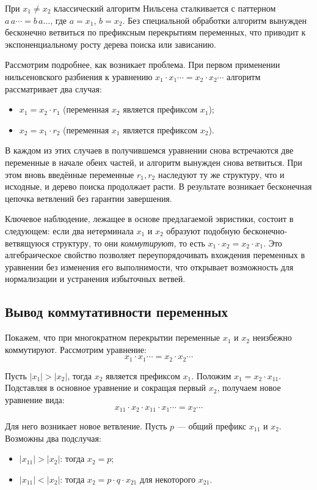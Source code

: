 \documentclass[14pt, russian]{scrartcl}
\begin{document}
При $x_1 \neq x_2$ классический алгоритм Нильсена сталкивается с паттерном
$a\,a\cdots = b\,a\ldots$, где $a = x_1$, $b = x_2$. Без специальной обработки
алгоритм вынужден бесконечно ветвиться по префиксным перекрытиям переменных,
что приводит к экспоненциальному росту дерева поиска или зависанию.

Рассмотрим подробнее, как возникает проблема. При первом применении
нильсеновского разбиения к уравнению $x_1 \cdot x_1 \cdots = x_2 \cdot x_2 \cdots$
алгоритм рассматривает два случая:
\begin{itemize}
\item $x_1 = x_2 \cdot r_1$ (переменная $x_2$ является префиксом $x_1$);
\item $x_2 = x_1 \cdot r_2$ (переменная $x_1$ является префиксом $x_2$).
\end{itemize}

В каждом из этих случаев в получившемся уравнении снова встречаются две переменные
в начале обеих частей, и алгоритм вынужден снова ветвиться. При этом вновь введённые
переменные $r_1, r_2$ наследуют ту же структуру, что и исходные, и дерево поиска
продолжает расти. В результате возникает бесконечная цепочка ветвлений без
гарантии завершения.

Ключевое наблюдение, лежащее в основе предлагаемой эвристики, состоит в следующем:
если два нетерминала $x_1$ и $x_2$ образуют подобную бесконечно-ветвящуюся
структуру, то они \emph{коммутируют}, то есть $x_1 \cdot x_2 = x_2 \cdot x_1$.
Это алгебраическое свойство позволяет переупорядочивать вхождения переменных
в уравнении без изменения его выполнимости, что открывает возможность для
нормализации и устранения избыточных ветвей.

\subsection{Вывод коммутативности переменных}

Покажем, что при многократном перекрытии переменные $x_1$ и $x_2$ неизбежно
коммутируют. Рассмотрим уравнение:
\[
x_1 \cdot x_1 \cdots = x_2 \cdot x_2 \cdots
\]

Пусть $|x_1| > |x_2|$, тогда $x_2$ является префиксом $x_1$. Положим
$x_1 = x_2 \cdot x_{11}$. Подставляя в основное уравнение и сокращая первый $x_2$,
получаем новое уравнение вида:
\[
x_{11} \cdot x_2 \cdot x_{11} \cdot x_1 \cdots = x_2 \cdots
\]

Для него возникает новое ветвление. Пусть $p$ --- общий префикс $x_{11}$ и $x_2$.
Возможны два подслучая:
\begin{itemize}
\item $|x_{11}| > |x_2|$: тогда $x_2 = p$;
\item $|x_{11}| < |x_2|$: тогда $x_2 = p \cdot q \cdot x_{21}$ для некоторого $x_{21}$.
\end{itemize}
\end{document}
